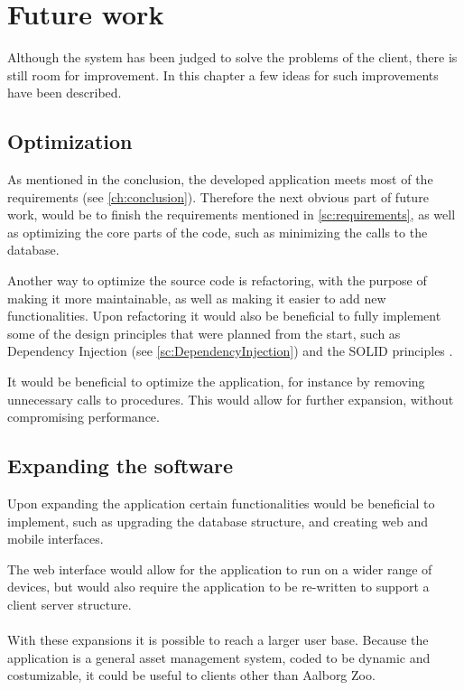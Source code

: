 \chapter{Future work}
Although the system has been judged to solve the problems of the client, there is still room for improvement. In this chapter a few ideas for such improvements have been described. 

\section{Optimization}
As mentioned in the conclusion, the developed application meets most of the requirements (see \autoref{ch:conclusion}). Therefore the next obvious part of future work, would be to finish the requirements mentioned  in \autoref{sc:requirements}, as well as optimizing the core parts of the code, such as minimizing the calls to the database. 
\par
Another way to optimize the source code is refactoring, with the purpose of making it more maintainable, as well as making it easier to add new functionalities. Upon refactoring it would also be beneficial to fully implement some of the design principles that were planned from the start, such as Dependency Injection (see \autoref{sc:DependencyInjection}) and the SOLID principles \citep{AgilePPP}.
\par
It would be beneficial to optimize the application, for instance by removing unnecessary calls to procedures. This would allow for further expansion, without compromising performance.

\section{Expanding the software}
Upon expanding the application certain functionalities would be beneficial to implement, such as upgrading the database structure, and creating web and mobile interfaces.
\par
The web interface would allow for the application to run on a wider range of devices, but would also require the application to be re-written to support a client server structure. 
\\\\
With these expansions it is possible to reach a larger user base. Because the application is a general asset management system, coded to be dynamic and costumizable, it could be useful to clients other than Aalborg Zoo.